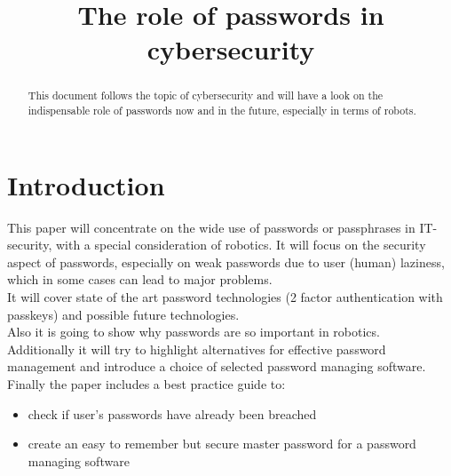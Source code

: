 \documentclass[conference]{IEEEtran}
\begin{document}
\title{The role of passwords in cybersecurity}
\author{
\and
{}
\and
{}
\and
{}
}
\maketitle

\begin{abstract}
This document follows the topic of cybersecurity and will have a look on the indispensable role of passwords now and in the future, especially in terms of robots.

\end{abstract}


\section{Introduction}
This paper will concentrate on the wide use of passwords or passphrases in IT-security, with a special consideration of robotics. It will focus on the security aspect of passwords, especially on weak passwords due to user (human) laziness, which in some cases can lead to major problems. \\
It will cover state of the art password technologies (2 factor authentication with passkeys) and possible future technologies.\\
Also it is going to show why passwords are so important in robotics. \\
Additionally it will try to highlight alternatives for effective password management and introduce a choice of selected password managing software. \\
Finally the paper includes a best practice guide to:
\begin{itemize}
\item check if user's passwords have already been breached 
\item create an easy to remember but secure master password for a password managing software
\end{itemize} 
\end{document}
